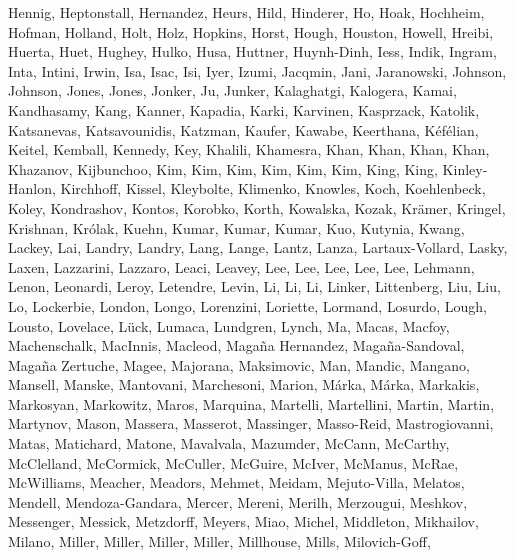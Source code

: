 \documentclass[times,tight]{aastex631}
\begin{document}
\begin{thebibliography}{}
{  {Hennig}, {Heptonstall}, {Hernandez}, {Heurs}, {Hild}, {Hinderer}, {Ho},
  {Hoak}, {Hochheim}, {Hofman}, {Holland}, {Holt}, {Holz}, {Hopkins}, {Horst},
  {Hough}, {Houston}, {Howell}, {Hreibi}, {Huerta}, {Huet}, {Hughey}, {Hulko},
  {Husa}, {Huttner}, {Huynh-Dinh}, {Iess}, {Indik}, {Ingram}, {Inta}, {Intini},
  {Irwin}, {Isa}, {Isac}, {Isi}, {Iyer}, {Izumi}, {Jacqmin}, {Jani},
  {Jaranowski}, {Johnson}, {Johnson}, {Jones}, {Jones}, {Jonker}, {Ju},
  {Junker}, {Kalaghatgi}, {Kalogera}, {Kamai}, {Kandhasamy}, {Kang}, {Kanner},
  {Kapadia}, {Karki}, {Karvinen}, {Kasprzack}, {Katolik}, {Katsanevas},
  {Katsavounidis}, {Katzman}, {Kaufer}, {Kawabe}, {Keerthana},
  {K{\'e}f{\'e}lian}, {Keitel}, {Kemball}, {Kennedy}, {Key}, {Khalili},
  {Khamesra}, {Khan}, {Khan}, {Khan}, {Khan}, {Khazanov}, {Kijbunchoo}, {Kim},
  {Kim}, {Kim}, {Kim}, {Kim}, {Kim}, {King}, {King}, {Kinley-Hanlon},
  {Kirchhoff}, {Kissel}, {Kleybolte}, {Klimenko}, {Knowles}, {Koch},
  {Koehlenbeck}, {Koley}, {Kondrashov}, {Kontos}, {Korobko}, {Korth},
  {Kowalska}, {Kozak}, {Kr{\"a}mer}, {Kringel}, {Krishnan}, {Kr{\'o}lak},
  {Kuehn}, {Kumar}, {Kumar}, {Kumar}, {Kuo}, {Kutynia}, {Kwang}, {Lackey},
  {Lai}, {Landry}, {Landry}, {Lang}, {Lange}, {Lantz}, {Lanza},
  {Lartaux-Vollard}, {Lasky}, {Laxen}, {Lazzarini}, {Lazzaro}, {Leaci},
  {Leavey}, {Lee}, {Lee}, {Lee}, {Lee}, {Lee}, {Lehmann}, {Lenon}, {Leonardi},
  {Leroy}, {Letendre}, {Levin}, {Li}, {Li}, {Li}, {Linker}, {Littenberg},
  {Liu}, {Liu}, {Lo}, {Lockerbie}, {London}, {Longo}, {Lorenzini}, {Loriette},
  {Lormand}, {Losurdo}, {Lough}, {Lousto}, {Lovelace}, {L{\"u}ck}, {Lumaca},
  {Lundgren}, {Lynch}, {Ma}, {Macas}, {Macfoy}, {Machenschalk}, {MacInnis},
  {Macleod}, {Maga{\~n}a Hernandez}, {Maga{\~n}a-Sandoval}, {Maga{\~n}a
  Zertuche}, {Magee}, {Majorana}, {Maksimovic}, {Man}, {Mandic}, {Mangano},
  {Mansell}, {Manske}, {Mantovani}, {Marchesoni}, {Marion}, {M{\'a}rka},
  {M{\'a}rka}, {Markakis}, {Markosyan}, {Markowitz}, {Maros}, {Marquina},
  {Martelli}, {Martellini}, {Martin}, {Martin}, {Martynov}, {Mason}, {Massera},
  {Masserot}, {Massinger}, {Masso-Reid}, {Mastrogiovanni}, {Matas},
  {Matichard}, {Matone}, {Mavalvala}, {Mazumder}, {McCann}, {McCarthy},
  {McClelland}, {McCormick}, {McCuller}, {McGuire}, {McIver}, {McManus},
  {McRae}, {McWilliams}, {Meacher}, {Meadors}, {Mehmet}, {Meidam},
  {Mejuto-Villa}, {Melatos}, {Mendell}, {Mendoza-Gandara}, {Mercer}, {Mereni},
  {Merilh}, {Merzougui}, {Meshkov}, {Messenger}, {Messick}, {Metzdorff},
  {Meyers}, {Miao}, {Michel}, {Middleton}, {Mikhailov}, {Milano}, {Miller},
  {Miller}, {Miller}, {Miller}, {Millhouse}, {Mills}, {Milovich-Goff},
}
\end{thebibliography}
\end{document}
